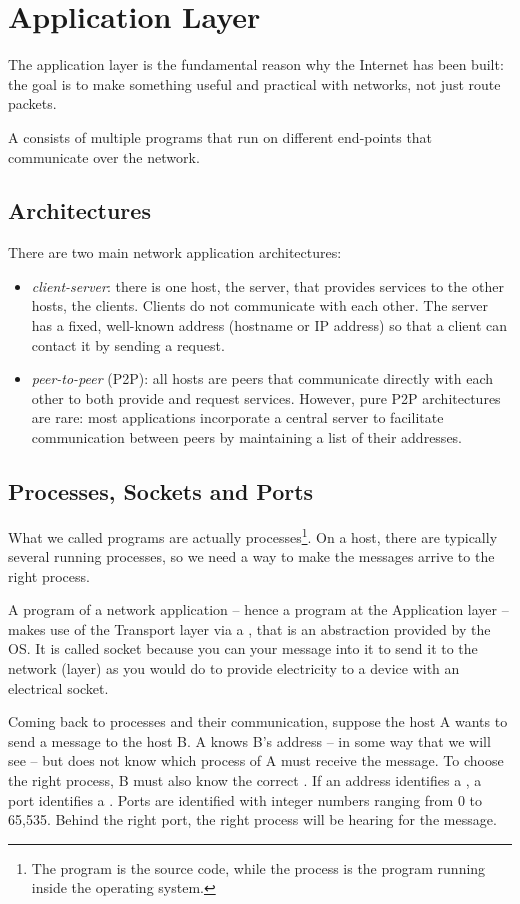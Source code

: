 \chapter{Application Layer}
The application layer is the fundamental reason why the Internet has been built: the goal is to make something useful and practical with networks, not just route packets.

A  consists of multiple programs that run on different end-points that communicate over the network. 

\section{Architectures}
There are two main network application architectures:
\begin{itemize}
    \item \emph{client-server}: there is one host, the server, that provides services to the other hosts, the clients. Clients do not communicate with each other. The server has a fixed, well-known address (hostname or IP address) so that a client can contact it by sending a request.
    \item \emph{peer-to-peer} (P2P): all hosts are peers that communicate directly with each other to both provide and request services. However, pure P2P architectures are rare: most applications incorporate a central server to facilitate communication between peers by maintaining a list of their addresses.
\end{itemize}

\section{Processes, Sockets and Ports}
What we called programs are actually processes\footnote{The program is the source code, while the process is the program running inside the operating system.}. 
On a host, there are typically several running processes, so we need a way to make the messages arrive to the right process.

A program of a network application -- hence a program at the Application layer -- makes use of the Transport layer via a , that is an abstraction provided by the OS.
It is called socket because you can  your message into it to send it to the network (layer) as you would do to provide electricity to a device with an electrical socket.

Coming back to processes and their communication, suppose the host A wants to send a message to the host B. 
A knows B's address -- in some way that we will see -- but does not know which process of A must receive the message.
To choose the right process, B must also know the correct . 
If an address identifies a , a port identifies a .
Ports are identified with integer numbers ranging from 0 to 65,535.
Behind the right port, the right process will be hearing for the message.

